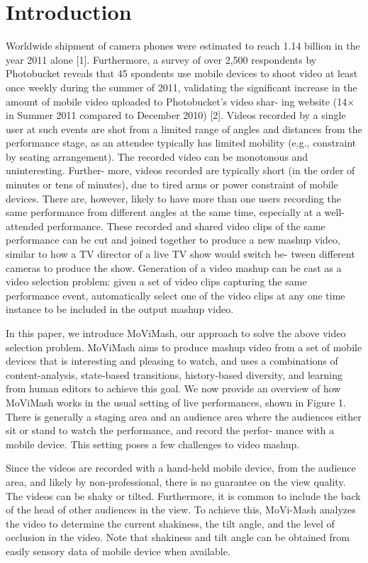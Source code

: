 \documentclass{sig-alternate-05-2015}
\begin{document}
\section{Introduction}
Worldwide shipment of camera phones were estimated to reach
1.14 billion in the year 2011 alone [1]. Furthermore, a survey of
over 2,500 respondents by Photobucket reveals that 45%
spondents use mobile devices to shoot video at least once weekly during the summer of 2011, validating the significant increase in
the amount of mobile video uploaded to Photobucket’s video shar-
ing website (14× in Summer 2011 compared to December 2010) [2]. Videos recorded by
a single user at such events are shot from a limited range of angles and distances from the performance stage, as an attendee typically has limited mobility (e.g., constraint by seating arrangement).
The recorded video can be monotonous and uninteresting. Further-
more, videos recorded are typically short (in the order of minutes
or tens of minutes), due to tired arms or power constraint of mobile
devices. There are, however, likely to have more than one users
recording the same performance from different angles at the same
time, especially at a well-attended performance.
These recorded and shared video clips of the same performance
can be cut and joined together to produce a new mashup video,
similar to how a TV director of a live TV show would switch be-
tween different cameras to produce the show. Generation of a video
mashup can be cast as a video selection problem: given a set of
video clips capturing the same performance event, automatically
select one of the video clips at any one time instance to be included
in the output mashup video.

In this paper, we introduce MoViMash, our approach to solve
the above video selection problem. MoViMash aims to produce
mashup video from a set of mobile devices that is interesting and
pleasing to watch, and uses a combinations of content-analysis,
state-based transitions, history-based diversity, and learning from
human editors to achieve this goal.
We now provide an overview of how MoViMash works in the
usual setting of live performances, shown in Figure 1. There is
generally a staging area and an audience area where the audiences
either sit or stand to watch the performance, and record the perfor-
mance with a mobile device. This setting poses a few challenges to
video mashup.

Since the videos are recorded with a hand-held mobile device,
from the audience area, and likely by non-professional, there is no
guarantee on the view quality. The videos can be shaky or tilted.
Furthermore, it is common to include the back of the head of other audiences in the view. To achieve this, MoVi-Mash analyzes the video to determine the current shakiness, the tilt
angle, and the level of occlusion in the video. Note that shakiness and tilt angle can be obtained from easily sensory data of mobile
device when available.
\end{document}
